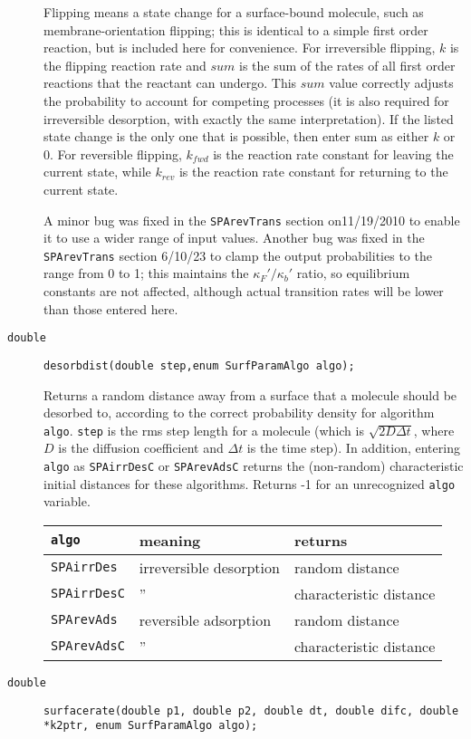 \documentclass[11pt]{article}
\newcommand {\ttt} {\texttt}
\begin{document}
\begin{description}
Flipping means a state change for a surface-bound molecule, such as membrane-orientation flipping; this is identical to a simple first order reaction, but is included here for convenience. For irreversible flipping, $k$ is the flipping reaction rate and $sum$ is the sum of the rates of all first order reactions that the reactant can undergo. This $sum$ value correctly adjusts the probability to account for competing processes (it is also required for irreversible desorption, with exactly the same interpretation). If the listed state change is the only one that is possible, then enter sum as either $k$ or 0. For reversible flipping, $k_{fwd}$ is the reaction rate constant for leaving the current state, while $k_{rev}$ is the reaction rate constant for returning to the current state.

A minor bug was fixed in the \ttt{SPArevTrans} section on11/19/2010 to enable it to use a wider range of input values. Another bug was fixed in the \ttt{SPArevTrans} section 6/10/23 to clamp the output probabilities to the range from 0 to 1; this maintains the $\kappa_F'/\kappa_b'$ ratio, so equilibrium constants are not affected, although actual transition rates will be lower than those entered here.


\item[\ttt{double}]
\ttt{desorbdist(double step,enum SurfParamAlgo algo);}

Returns a random distance away from a surface that a molecule should be desorbed to, according to the correct probability density for algorithm \ttt{algo}. \ttt{step} is the rms step length for a molecule (which is $\sqrt{2D\Delta t}$, where $D$ is the diffusion coefficient and $\Delta t$ is the time step). In addition, entering \ttt{algo} as \ttt{SPAirrDesC} or \ttt{SPArevAdsC} returns the (non-random) characteristic initial distances for these algorithms. Returns -1 for an unrecognized \ttt{algo} variable.

\begin{longtable}[c]{lll}
\ttt{algo} & meaning & returns \\
\hline
\ttt{SPAirrDes} & irreversible desorption & random distance \\
\ttt{SPAirrDesC} & '' & characteristic distance \\
\ttt{SPArevAds} & reversible adsorption & random distance \\
\ttt{SPArevAdsC} & '' & characteristic distance
\end{longtable}


\item[\ttt{double}]
\ttt{surfacerate(double p1, double p2, double dt, double difc, double *k2ptr, enum SurfParamAlgo algo);}


\end{description}
\end{document}
